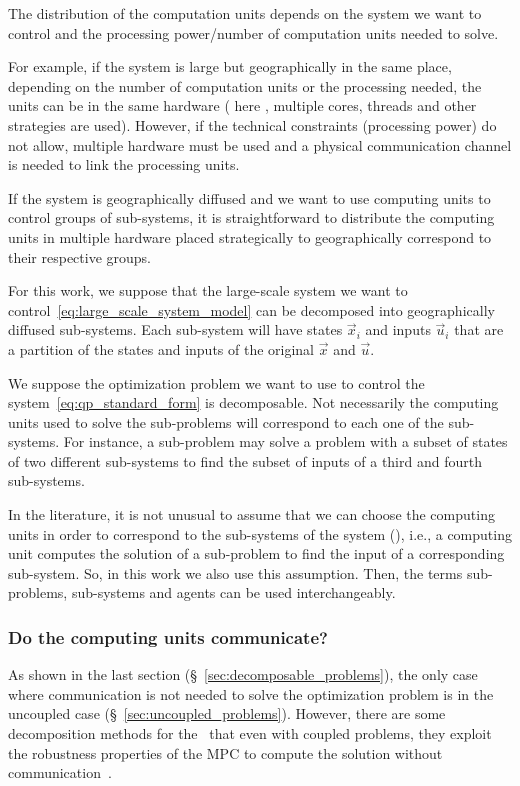 \documentclass[../main.tex]{subfiles}
\begin{document}
The distribution of the computation units depends on the system we want to control and the processing power/number of computation units needed to solve.

For example, if the system is large but geographically in the same place, depending on the number of computation units or the processing needed, the units can be in the same hardware ( here \GPU, multiple cores, threads and other strategies are used).
However, if the technical constraints (processing power) do not allow, multiple hardware must be used and a physical communication channel is needed to link the processing units.

If the system is geographically diffused and we want to use computing units to control groups of sub-systems, it is straightforward to distribute the computing units in multiple hardware placed strategically to geographically correspond to their respective groups.

For this work, we suppose that the large-scale system we want to control~\eqref{eq:large_scale_system_model} can be decomposed into geographically diffused sub-systems.
Each sub-system will have states $\vec{x}_{i}$ and inputs $\vec{u}_{i}$ that are a partition of the states and inputs of the original $\vec{x}$ and $\vec{u}$.

We suppose the optimization problem we want to use to control the system~\eqref{eq:qp_standard_form} is decomposable.
Not necessarily the computing units used to solve the sub-problems will correspond to each one of the sub-systems.
For instance, a sub-problem may solve a problem with a subset of states of two different sub-systems to find the subset of inputs of a third and fourth sub-systems.

In the literature, it is not unusual to assume that we can choose the computing units in order to correspond to the sub-systems of the system (), i.e., a computing unit computes the solution of a sub-problem to find the input of a corresponding sub-system.
So, in this work we also use this assumption.
Then, the terms sub-problems, sub-systems and agents can be used interchangeably.

\subsubsection{Do the computing units communicate?}

As shown in the last section (\S~\ref{sec:decomposable_problems}), the only case where communication is not needed to solve the optimization problem is in the uncoupled case (\S~\ref{sec:uncoupled_problems}).
However, there are some decomposition methods for the \dmpc\ that even with coupled problems, they exploit the robustness properties of the MPC to compute the solution without communication~\cite{VahidNaghaviEtAl2014}.
\end{document}
